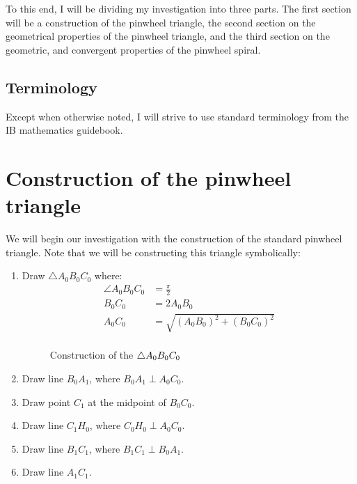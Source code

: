 To this end, I will be dividing my investigation into three parts. The first section will be a construction of the pinwheel triangle, the second section on the geometrical properties of the pinwheel triangle, and the third section on the geometric, and convergent properties of the pinwheel spiral.

\subsection{Terminology}
Except when otherwise noted, I will strive to use standard terminology from the IB mathematics guidebook.

\newpage
\section{Construction of the pinwheel triangle}
We will begin our investigation with the construction of the standard pinwheel triangle. Note that we will be constructing this triangle symbolically:

\begin{enumerate}
    \item Draw $\triangle A_{0}B_{0}C_{0}$ where:
    \begin{equation}
        \begin{aligned}
            \angle A_{0}B_{0}C_{0} &= \frac{\pi}{2} \\
            B_{0}C_{0} &= 2A_{0}B_{0} \\
            A_{0}C_{0} &= \sqrt{(A_{0}B_{0})^2 + (B_{0}C_{0})^2} \\
        \end{aligned}
    \end{equation}
    \begin{figure}[H]
        \centering
        \label{right-triangle}
        \caption{Construction of the $\protect\triangle A_{0}B_{0}C_{0}$}
    \end{figure}

    \item Draw line $B_{0}A_{1}$, where $B_{0}A_{1} \perp A_{0}C_{0}$.
    \item Draw point $C_{1}$ at the midpoint of $B_{0}C_{0}$.
    \item Draw line $C_{1}H_{0}$, where $C_{0}H_{0} \perp A_{0}C_{0}$.
    \item Draw line $B_{1}C_{1}$, where $B_{1}C_{1} \perp B_{0}A_{1}$.
    \item Draw line $A_{1}C_{1}$.
\end{enumerate}

